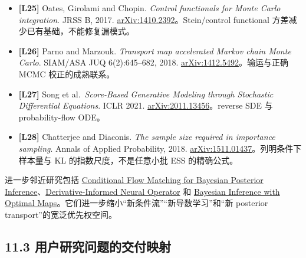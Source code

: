 \documentclass[
  11pt,
  a4paper,
]{article}
\begin{document}
\begin{itemize}
\item
  \textbf{{[}L25{]}} Oates, Girolami and Chopin. \emph{Control
  functionals for Monte Carlo integration}. JRSS B, 2017.
  \href{https://arxiv.org/abs/1410.2392}{arXiv:1410.2392}。Stein/control
  functional 方差减少已有基础，不能修复漏模式。
\item
  \textbf{{[}L26{]}} Parno and Marzouk. \emph{Transport map accelerated
  Markov chain Monte Carlo}. SIAM/ASA JUQ 6(2):645--682, 2018.
  \href{https://arxiv.org/abs/1412.5492}{arXiv:1412.5492}。输运与正确
  MCMC 校正的成熟联系。
\item
  \textbf{{[}L27{]}} Song et al.~\emph{Score-Based Generative Modeling
  through Stochastic Differential Equations}. ICLR 2021.
  \href{https://arxiv.org/abs/2011.13456}{arXiv:2011.13456}。reverse SDE
  与 probability-flow ODE。
\item
  \textbf{{[}L28{]}} Chatterjee and Diaconis. \emph{The sample size
  required in importance sampling}. Annals of Applied Probability, 2018.
  \href{https://arxiv.org/abs/1511.01437}{arXiv:1511.01437}。列明条件下样本量与
  KL 的指数尺度，不是任意小批 ESS 的精确公式。
\end{itemize}

进一步邻近研究包括 \href{https://arxiv.org/abs/2510.09534}{Conditional
Flow Matching for Bayesian Posterior
Inference}、\href{https://arxiv.org/abs/2206.10745}{Derivative-Informed
Neural Operator} 和 \href{https://arxiv.org/abs/1109.1516}{Bayesian
Inference with Optimal
Maps}。它们进一步缩小``新条件流''``新导数学习''和``新 posterior
transport''的宽泛优先权空间。

\hypertarget{ux7528ux6237ux7814ux7a76ux95eeux9898ux7684ux4ea4ux4ed8ux6620ux5c04}{%
\subsection{11.3
用户研究问题的交付映射}\label{ux7528ux6237ux7814ux7a76ux95eeux9898ux7684ux4ea4ux4ed8ux6620ux5c04}}
\end{document}
